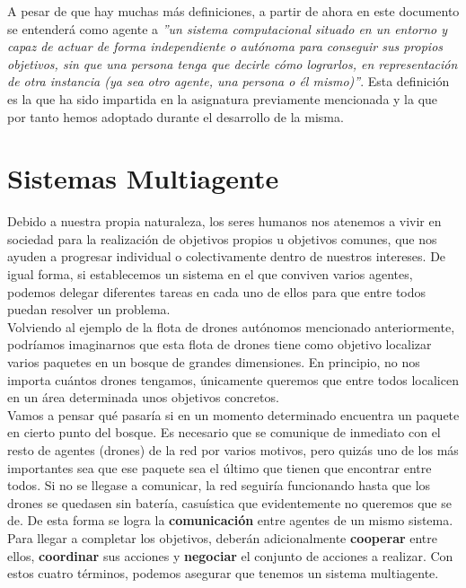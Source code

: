 A pesar de que hay muchas más definiciones, a partir de ahora en este documento se entenderá como agente a \textit{''un sistema computacional situado en un entorno y capaz de actuar de forma independiente o autónoma para conseguir sus propios objetivos, sin que una persona tenga que decirle cómo lograrlos, en representación de otra instancia (ya sea otro agente, una persona o él mismo)''}. Esta definición es la que ha sido impartida en la asignatura previamente mencionada y la que por tanto hemos adoptado durante el desarrollo de la misma.

\section{Sistemas Multiagente}

Debido a nuestra propia naturaleza, los seres humanos nos atenemos a vivir en sociedad para la realización de objetivos propios u objetivos comunes, que nos ayuden a progresar individual o colectivamente dentro de nuestros intereses. De igual forma, si establecemos un sistema en el que conviven varios agentes, podemos delegar diferentes tareas en cada uno de ellos para que entre todos puedan resolver un problema.\\

Volviendo al ejemplo de la flota de drones autónomos mencionado anteriormente, podríamos imaginarnos que esta flota de drones tiene como objetivo localizar varios paquetes en un bosque de grandes dimensiones. En principio, no nos importa cuántos drones tengamos, únicamente queremos que entre todos localicen en un área determinada unos objetivos concretos.\\

Vamos a pensar qué pasaría si en un momento determinado encuentra un paquete en cierto punto del bosque. Es necesario que se comunique de inmediato con el resto de agentes (drones) de la red por varios motivos, pero quizás uno de los más importantes sea que ese paquete sea el último que tienen que encontrar entre todos. Si no se llegase a comunicar, la red seguiría funcionando hasta que los drones se quedasen sin batería, casuística que evidentemente no queremos que se de. De esta forma se logra la \textbf{comunicación} entre agentes de un mismo sistema.\\

Para llegar a completar los objetivos, deberán adicionalmente \textbf{cooperar} entre ellos, \textbf{coordinar} sus acciones y \textbf{negociar} el conjunto de acciones a realizar. Con estos cuatro términos, podemos asegurar que tenemos un sistema multiagente.

